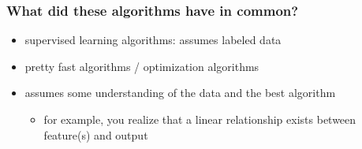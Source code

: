 \documentclass[xcolor=table]{beamer}
\begin{document}
\begin{mdframe}%

\frametitle{What did these algorithms have in common?}\label{heading-sec-what-did-these-algorithms-have-in-common}%

\begin{itemize}%

\item{}
supervised learning algorithms: assumes labeled data%

\item{}
pretty fast algorithms / optimization algorithms%

\item{}
assumes some understanding of the data and the best algorithm%

\begin{itemize}[noitemsep,topsep=\mdcompacttopsep]%

\item{}for example, you realize that a linear relationship exists between feature(s) and output%
\end{itemize}%
\end{itemize}%
\end{mdframe}\label{sec-what-did-these-algorithms-have-in-common}%
\end{document}
